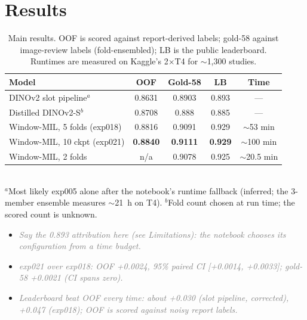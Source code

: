 \documentclass[conference]{IEEEtran}
\newcommand{\nt}[1]{\textcolor{gray}{\textit{#1}}}            %
\begin{document}
\section{Results}
\begin{table}[t]   %
\caption{Main results. OOF is scored against report-derived labels; gold-58 against image-review labels (fold-ensembled);
LB is the public leaderboard. Runtimes are measured on Kaggle's 2$\times$T4 for $\sim$1,300 studies.}
\label{tab:main}
\centering\footnotesize
\begin{tabular}{@{}p{2.55cm}cccc@{}}
\toprule
Model & OOF & Gold-58 & LB & Time \\
\midrule
DINOv2 slot pipeline$^{a}$ & 0.8631 & 0.8903 & 0.893 & --- \\  %
Distilled DINOv2-S$^{b}$ & 0.8708 & 0.888 & 0.885 & --- \\       %
Window-MIL, 5 folds (exp018) & 0.8816 & 0.9091 & 0.929 & $\sim$53 min \\   %
Window-MIL, 10 ckpt (exp021) & \textbf{0.8840} & \textbf{0.9111} & \textbf{0.929} & $\sim$100 min \\ %
Window-MIL, 2 folds & n/a & 0.9078 & 0.925 & $\sim$20.5 min \\     %
\bottomrule
\end{tabular}\\[2pt]
{\footnotesize $^{a}$Most likely exp005 alone after the notebook's runtime fallback (inferred; the 3-member ensemble
measures $\sim$21~h on T4). $^{b}$Fold count chosen at run time; the scored count is unknown.}
\end{table}
\begin{notes}
\begin{itemize}
\item \nt{Say the 0.893 attribution here (see Limitations): the notebook chooses its configuration from a time budget.}
\item \nt{exp021 over exp018: OOF +0.0024, 95\% paired CI [+0.0014, +0.0033]; gold-58 +0.0021 (CI spans zero).}
\item \nt{Leaderboard beat OOF every time: about +0.030 (slot pipeline, corrected), +0.047 (exp018); OOF is scored against
noisy report labels.}  %
\end{itemize}
\end{notes}
\end{document}
